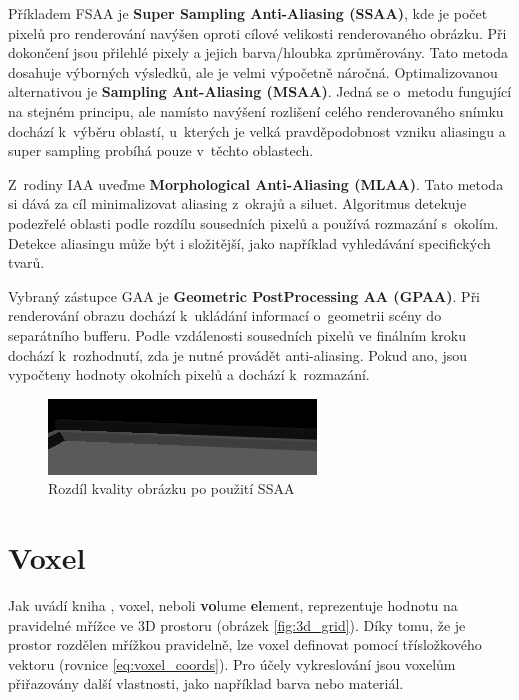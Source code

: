 Příkladem FSAA je \textbf{Super Sampling Anti-Aliasing (SSAA)}, kde je počet pixelů pro renderování navýšen oproti cílové velikosti renderovaného obrázku. Při dokončení jsou přilehlé pixely a jejich barva/hloubka zprůměrovány. Tato metoda dosahuje výborných výsledků, ale je velmi výpočetně náročná. Optimalizovanou alternativou je \textbf{Sampling Ant-Aliasing (MSAA)}. Jedná se o~metodu fungující na stejném principu, ale namísto navýšení rozlišení celého renderovaného snímku dochází k~výběru oblastí, u~kterých je velká pravděpodobnost vzniku aliasingu a super sampling probíhá pouze v~těchto oblastech.

Z~rodiny IAA uveďme\textbf{ Morphological Anti-Aliasing (MLAA)}. Tato metoda si dává za cíl minimalizovat aliasing z~okrajů a siluet. Algoritmus detekuje podezřelé oblasti podle rozdílu sousedních pixelů a používá rozmazání s~okolím. Detekce aliasingu může být i složitější, jako například vyhledávání specifických tvarů.


Vybraný zástupce GAA je \textbf{Geometric PostProcessing AA (GPAA)}. Při renderování obrazu dochází k~ukládání informací o~geometrii scény do separátního bufferu. Podle vzdálenosti sousedních pixelů ve finálním kroku dochází k~rozhodnutí, zda je nutné provádět anti-aliasing. Pokud ano, jsou vypočteny hodnoty okolních pixelů a dochází k~rozmazání.

\begin{figure}[H]
	\centering
	\includegraphics[scale=3]{obrazky-figures/ssaa_diff.png}
	\caption{Rozdíl kvality obrázku po použití SSAA}
	\label{fig:aliasing}
\end{figure}




\section{Voxel} \label{voxels}
Jak uvádí kniha \cite{gfx_principles_practice}, voxel, neboli \textbf{vo}lume \textbf{el}ement, reprezentuje hodnotu na pravidelné mřížce ve 3D prostoru (obrázek \ref{fig:3d_grid}). Díky tomu, že je prostor rozdělen mřížkou pravidelně, lze voxel definovat pomocí třísložkového vektoru (rovnice \ref{eq:voxel_coords}). Pro účely vykreslování jsou voxelům přiřazovány další vlastnosti, jako například barva nebo materiál.

